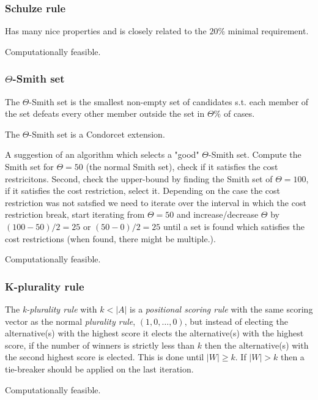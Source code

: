 \documentclass{article}
\begin{document}
\subsubsection{Schulze rule}

Has many nice properties and is closely related to the $20\%$ minimal requirement.

Computationally feasible.

\subsubsection{$\Theta$-Smith set}

The $\Theta$-Smith set is the smallest non-empty set of candidates s.t. each member of the set defeats every other member outside
 the set in $\Theta \%$ of cases.

 The $\Theta$-Smith set is a Condorcet extension.

A suggestion of an algorithm which selects a "good" $\Theta$-Smith set. Compute the Smith set for $\Theta=50$
(the normal Smith set), check if it satisfies the cost restricitons. Second, check the upper-bound by finding the Smith
set of $\Theta=100$, if it satisfies the cost restriction, select it. Depending on the case the cost restriction was not
satsfied we need to iterate over the interval in which the cost restriction break, start iterating from $\Theta=50$ and
 increase/decrease $\Theta$ by $(100-50)/2=25$ or $(50-0)/2=25$ until a set is found which satisfies the cost
 restrictions (when found, there might be multiple.).

Computationally feasible.

\subsubsection{K-plurality rule}

The {\em k-plurality rule} with $k<|A|$ is a {\em positional scoring rule} with the same scoring vector as the normal
{\em plurality rule}, $(1,0, \dots, 0)$, but instead of electing the alternative(s) with the highest score it elects the
alternative(s) with the highest score, if the number of winners is strictly less than $k$ then the alternative(s) with
the second highest score is elected. This is done until $|W| \geq k$. If $|W| > k$ then a tie-breaker should be applied
on the last iteration.

Computationally feasible.



\end{document}
